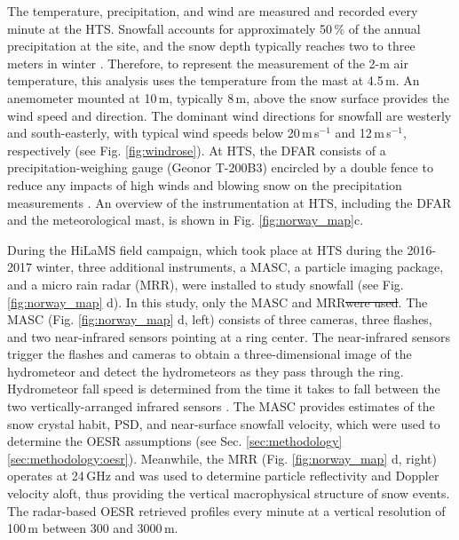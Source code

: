 \documentclass{ametsocV5}
\providecommand{\DIFadd}[1]{{\protect\color{blue}\uwave{#1}}} %
\providecommand{\DIFdel}[1]{{\protect\color{red}\sout{#1}}}                      %
\providecommand{\DIFaddbegin}{} %
\providecommand{\DIFaddend}{} %
\providecommand{\DIFdelbegin}{} %
\providecommand{\DIFdelend}{} %
\newcommand{\DIFscaledelfig}{0.5}
\newlength{\DIFdelgraphicswidth} %
\newlength{\DIFdelgraphicsheight} %
\newcommand{\DIFaddincludegraphics}[2][]{{\color{blue}\fbox{\DIFOincludegraphics[#1]{#2}}}} %
\newcommand{\DIFdelincludegraphics}[2][]{%
\sbox{\DIFdelgraphicsbox}{\DIFOincludegraphics[#1]{#2}}%
\settoboxwidth{\DIFdelgraphicswidth}{\DIFdelgraphicsbox} %
\settoboxtotalheight{\DIFdelgraphicsheight}{\DIFdelgraphicsbox} %
\scalebox{\DIFscaledelfig}{%
\parbox[b]{\DIFdelgraphicswidth}{\usebox{\DIFdelgraphicsbox}\\[-\baselineskip] \rule{\DIFdelgraphicswidth}{0em}}\llap{\resizebox{\DIFdelgraphicswidth}{\DIFdelgraphicsheight}{%
\setlength{\unitlength}{\DIFdelgraphicswidth}%
\begin{picture}(1,1)%
\thicklines\linethickness{2pt} %
{\color[rgb]{1,0,0}\put(0,0){\framebox(1,1){}}}%
{\color[rgb]{1,0,0}\put(0,0){\line( 1,1){1}}}%
{\color[rgb]{1,0,0}\put(0,1){\line(1,-1){1}}}%
\end{picture}%
}\hspace*{3pt}}} %
} %
\DeclareRobustCommand{\DIFaddbegin}{\DIFOaddbegin \let\includegraphics\DIFaddincludegraphics} %
\DeclareRobustCommand{\DIFaddend}{\DIFOaddend \let\includegraphics\DIFOincludegraphics} %
\DeclareRobustCommand{\DIFdelbegin}{\DIFOdelbegin \let\includegraphics\DIFdelincludegraphics} %
\DeclareRobustCommand{\DIFdelend}{\DIFOaddend \let\includegraphics\DIFOincludegraphics} %
\begin{document}
		The temperature, precipitation, and wind are measured and recorded every minute at the HTS. Snowfall accounts for approximately 50\,\% of the annual precipitation at the site, and the snow depth typically reaches two to three meters in winter \citep{wolff_derivation_2015}. Therefore, to represent the measurement of the 2-m air temperature, this analysis uses the temperature from the mast at 4.5\,m. An anemometer mounted at 10\,m, typically 8\,m, above the snow surface provides the wind speed and direction. The dominant wind directions for snowfall are westerly and south-easterly, with typical wind speeds below 20\,m\,s$^{-1}$ and 12\,m\,s$^{-1}$, respectively (see Fig. \ref{fig:windrose}). At HTS, the DFAR consists of a precipitation-weighing gauge (Geonor T-200B3) encircled by a double fence to reduce any impacts of high winds and blowing snow on the precipitation measurements \citep{goodison_wmo_1998}. An overview of the instrumentation at HTS, including the DFAR and the meteorological mast, is shown in Fig. \ref{fig:norway_map}c. 

		During the HiLaMS field campaign, which took place at HTS during the 2016-2017 winter, three additional instruments, a MASC, a particle imaging package, and a micro rain radar (MRR), were installed to study snowfall (see Fig. \ref{fig:norway_map} d). In this study, \DIFaddbegin \DIFadd{the OESR algorithm uses }\DIFaddend only the MASC and MRR\DIFdelbegin \DIFdel{were used}\DIFdelend . The MASC (Fig. \ref{fig:norway_map} d, left) consists of three cameras, three flashes, and two near-infrared sensors pointing at a ring center. The near-infrared sensors trigger the flashes and cameras to obtain a three-dimensional image of the hydrometeor and detect the hydrometeors as they pass through the ring. Hydrometeor fall speed is determined from the time it takes to fall between the two vertically-arranged infrared sensors \citep{garrett_fall_2012}. %
		The MASC provides estimates of the snow crystal habit, PSD, and near-surface snowfall velocity, which were used to determine the OESR assumptions (see Sec. \ref{sec:methodology}\ref{sec:methodology:oesr}). Meanwhile, the MRR (Fig. \ref{fig:norway_map} d, right) operates at 24\,GHz and was used to determine particle reflectivity and Doppler velocity aloft, thus providing the vertical macrophysical structure of snow events. The radar-based OESR retrieved profiles every minute at a vertical resolution of 100\,m between 300 and 3000\,m. 
\end{document}
